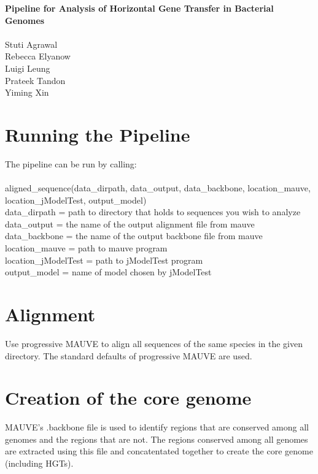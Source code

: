 \documentclass[11pt]{article}
\begin{document}
\begin{center}
\textbf{\LARGE{Pipeline for Analysis of Horizontal Gene Transfer in Bacterial Genomes}}\\
~~~\\
\Large{Stuti Agrawal}\\
\Large{Rebecca Elyanow}\\
\Large{Luigi Leung}\\
\Large{Prateek Tandon}\\
\Large{Yiming Xin}
\end{center}
\tableofcontents

%

\section{Running the Pipeline}
The pipeline can be run by calling:\\
\\
aligned\_sequence(data\_dirpath, data\_output, data\_backbone, location\_mauve, location\_jModelTest, output\_model)\\

data\_dirpath = path to directory that holds to sequences you wish to analyze\\
data\_output = the name of the output alignment file from mauve\\
data\_backbone = the name of the output backbone file from mauve\\
location\_mauve = path to mauve program\\
location\_jModelTest = path to jModelTest program\\
output\_model = name of model chosen by jModelTest\\

\section{Alignment}
Use progressive MAUVE \cite{mauve} to align all sequences of the same species in the given directory. The standard defaults of progressive MAUVE are used.\\

\section{Creation of the core genome}
MAUVE’s .backbone file is used to identify regions that are conserved among all genomes and the regions that are not. The regions conserved among all genomes are extracted using this file and concatentated together to create the core genome (including HGTs). \\
\end{document}
